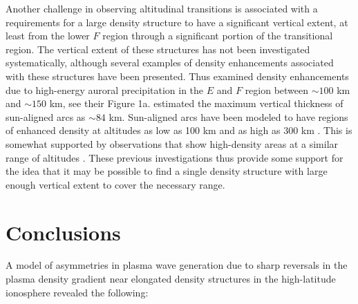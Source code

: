 Another challenge in observing altitudinal transitions is associated with a requirements for a large density structure to have a significant vertical extent, at least from the lower \(F\) region through a significant portion of the transitional region. The vertical extent of these structures has not been investigated systematically, although several examples of density enhancements associated with these structures have been presented. Thus \citet{Schlatter2013} examined density enhancements due to high-energy auroral precipitation in the \(E\) and \(F\) region between \(\sim100\) km and \(\sim150\) km, see their Figure 1a. \citet{Jayachandran2012} estimated the maximum vertical thickness of sun-aligned arcs as \(\sim84\) km.  Sun-aligned arcs have been modeled to have regions of enhanced density at altitudes as low as 100 km and as high as 300 km \citep{Crain1994}.  This is somewhat  supported by observations that show high-density areas at a similar range of altitudes \citep{Valladares1991}. These previous investigations thus provide some support for the idea that it may be possible to find a single density structure with large enough vertical extent to cover the necessary range.  



\section{Conclusions}
\label{sec:p2conclusions}
A model of asymmetries in plasma wave generation due to sharp reversals in the plasma density gradient near elongated density structures in the high-latitude ionosphere revealed the following:
 
